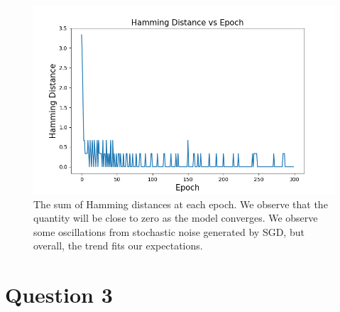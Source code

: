 \documentclass[
	12pt, %
]{../Template/fphw}
\begin{document}
\begin{figure}[!htbp]
    \centering
    \includegraphics[width=0.9\linewidth]{HW1/q3.png}
    \caption{The sum of Hamming distances at each epoch. We observe that the quantity will be close to zero as the model converges. We observe some oscillations from stochastic noise generated by SGD, but overall, the trend fits our expectations.}
    \label{fig: q3}
\end{figure}

\section*{Question 3}
\end{document}
